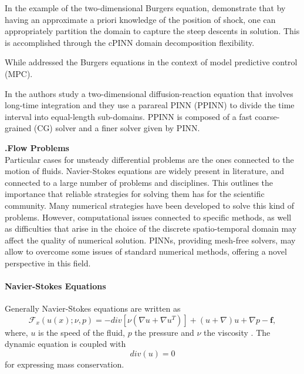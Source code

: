 \documentclass[pdflatex,sn-basic]{sn-jnl}%
\theoremstyle{thmstyleone}%
\theoremstyle{thmstyletwo}%
\theoremstyle{thmstylethree}%
\newcounter{paranum}[subsubsection]
\newcommand{\subsubsubsection}{\vspace{10pt}\noindent\textbf{\thesubsubsection.\refstepcounter{paranum}\theparanum\;}\textbf}
\begin{document}
In the example of the two-dimensional Burgers equation, \cite{Jag2020_ConservativePhysicsInformed_KhaJKK} demonstrate that by having an approximate a priori knowledge of the position of shock, one can appropriately partition the domain to capture the steep descents in solution. 
This is accomplished through the cPINN domain decomposition flexibility. 

While \cite{Arn2021_StateModelingControl_KinAK} addressed the Burgers equations in the context of model predictive control (MPC). 

In \cite{Men2020_PpinnPararealPhysics_LiMLZK} the authors study a two-dimensional diffusion-reaction equation that involves long-time integration and they use a parareal PINN (PPINN) to divide the time interval into equal-length sub-domains.
PPINN is composed of a fast coarse-grained (CG) solver and a finer solver given by PINN.

\subsubsubsection{Flow Problems}\\
Particular cases for unsteady differential problems are the ones connected to the motion of fluids. Navier-Stokes equations are widely present in literature, and connected to a large number of problems and disciplines. This outlines the importance that reliable strategies for solving them has for the scientific community. Many numerical strategies have been developed to solve this kind of problems. However, computational issues connected to specific methods, as well as difficulties that arise in the choice of the discrete spatio-temporal domain may affect the quality of numerical solution. PINNs, providing mesh-free solvers, may allow to overcome some issues of standard numerical methods, offering a novel perspective in this field.  

\paragraph{Navier-Stokes Equations}
Generally Navier-Stokes equations are written as
\begin{equation*}
\mathcal{F}_x(u(x);  \nu , p )  = - div[\nu (\nabla u+ \nabla u^T)] + (u+\nabla) u +\nabla p -\bm{f},
\end{equation*}
where, $u$ is the speed of the fluid, $p$ the pressure and $ \nu$ the viscosity \citep{Qua2013_NumericalModelsDifferential_Qua}.
The dynamic equation is coupled with
\begin{equation*}
div( u ) = 0 
\end{equation*}
for expressing mass conservation.
\end{document}
